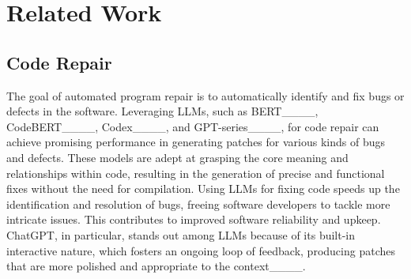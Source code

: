 \section{Related Work}
\label{section: related work}

\subsection{Code Repair} 

The goal of automated program repair is to automatically identify and fix bugs or defects in the software.
Leveraging LLMs, such as BERT____, CodeBERT____, Codex____, and GPT-series____, for code repair can achieve promising performance in generating patches for various kinds of bugs and defects.
These models are adept at grasping the core meaning and relationships within code, resulting in the generation of precise and functional fixes without the need for compilation.
Using LLMs for fixing code speeds up the identification and resolution of bugs, freeing software developers to tackle more intricate issues.
This contributes to improved software reliability and upkeep.
ChatGPT, in particular, stands out among LLMs because of its built-in interactive nature, which fosters an ongoing loop of feedback, producing patches that are more polished and appropriate to the context____.


